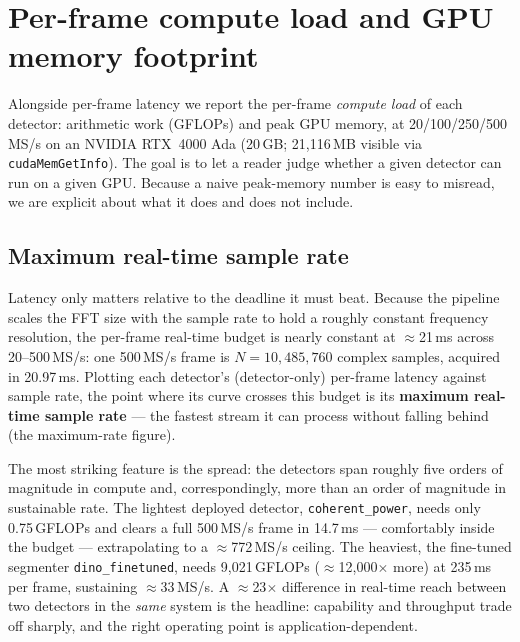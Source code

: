 
\section{Per-frame compute load and GPU memory footprint}
\label{sec:compute-load}

Alongside per-frame latency we report the per-frame \emph{compute load} of each detector:
arithmetic work (GFLOPs) and peak GPU memory, at 20/100/250/500\,MS/s on an NVIDIA
RTX~4000 Ada (20\,GB; 21{,}116\,MB visible via \texttt{cudaMemGetInfo}). The goal is to let a
reader judge whether a given detector can run on a given GPU. Because a naive peak-memory number is
easy to misread, we are explicit about what it does and does not include.

\subsection{Maximum real-time sample rate}
\label{sec:maxrate}

Latency only matters relative to the deadline it must beat. Because the pipeline scales the FFT size
with the sample rate to hold a roughly constant frequency resolution, the per-frame real-time budget
is nearly constant at $\approx$21\,ms across 20--500\,MS/s: one 500\,MS/s frame is
$N = 10{,}485{,}760$ complex samples, acquired in 20.97\,ms. Plotting each detector's (detector-only)
per-frame latency against sample rate, the point where its curve crosses this budget is its
\textbf{maximum real-time sample rate} --- the fastest stream it can process without falling behind
(the maximum-rate figure).

The most striking feature is the spread: the detectors span roughly five orders of magnitude in
compute and, correspondingly, more than an order of magnitude in sustainable rate. The lightest
deployed detector, \texttt{coherent\_power}, needs only 0.75\,GFLOPs and clears a full 500\,MS/s
frame in 14.7\,ms --- comfortably inside the budget --- extrapolating to a $\approx$772\,MS/s ceiling.
The heaviest, the fine-tuned segmenter \texttt{dino\_finetuned}, needs 9{,}021\,GFLOPs
($\approx$12{,}000$\times$ more) at 235\,ms per frame, sustaining $\approx$33\,MS/s. A
$\approx$23$\times$ difference in real-time reach between two detectors in the \emph{same} system is
the headline: capability and throughput trade off sharply, and the right operating point is
application-dependent.

